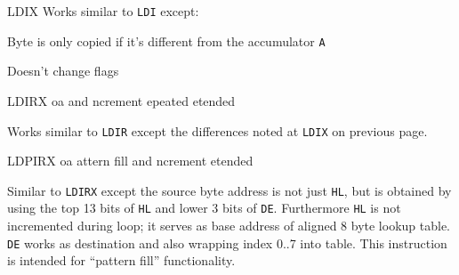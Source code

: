 \begin{basedescript}{
    \desclabelstyle{\multilinelabel}
    \desclabelwidth{3cm}}
\begin{DetailItem}{LDIX\ZXN}
        Works similar to {\tt LDI} except:
        \begin{DetailCompactList}
            \item Byte is only copied if it's different from the accumulator {\tt A}
            \item Doesn't change flags
        \end{DetailCompactList}

        \begin{DetailEffects}
            \FlagsLDIX
        \end{DetailEffects}
				
        \begin{DetailTiming}
        \end{DetailTiming}

    \end{DetailItem}

    \label{DetailRefLDIRX}
    \begin{DetailItem}{LDIRX\ZXN}
        {oa and ncrement epeated etended}		
        {\SymLDIRX}

        Works similar to {\tt LDIR} except the differences noted at {\tt LDIX} on previous page.

        \begin{DetailEffects}
            \FlagsLDIRX
        \end{DetailEffects}
				
        \begin{DetailTiming}
        \end{DetailTiming}

    \end{DetailItem}

    \label{DetailRefLDPIRX}
    \begin{DetailItem}{LDPIRX\ZXN}
        {oa attern fill and ncrement etended}
        {\SymLDPIRX}

        Similar to {\tt LDIRX} except the source byte address is not just {\tt HL}, but is obtained by using the top 13 bits of {\tt HL} and lower 3 bits of {\tt DE}. Furthermore {\tt HL} is not incremented during loop; it serves as base address of aligned 8 byte lookup table. {\tt DE} works as destination and also wrapping index 0..7 into table. This instruction is intended for ``pattern fill'' functionality.


\end{DetailItem}
\end{basedescript}
